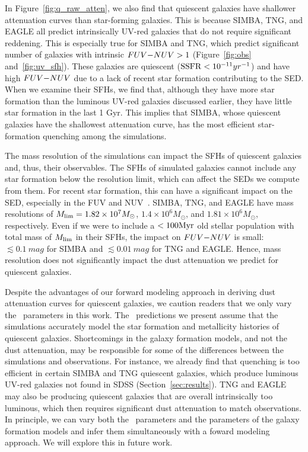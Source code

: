 In Figure~\ref{fig:q_raw_atten}, we also find that quiescent galaxies have
shallower attenuation curves than star-forming galaxies. 
This is because SIMBA, TNG, and EAGLE all predict intrinsically UV-red galaxies
that do not require significant reddening. 
This is especially true for SIMBA and TNG, which predict significant
number of galaxies with intrinsic $FUV{-}NUV > 1$ (Figure~\ref{fig:obs}
and~\ref{fig:uv_sfh}).
These galaxies are quiescent (${\rm SSFR} < 10^{-11}yr^{-1}$) and have high
$FUV{-}NUV$ due to a lack of recent star formation contributing to the
SED.
When we examine their SFHs, we find that, although they have more star
formation than the luminous UV-red galaxies discussed earlier, they have
little star formation in the last 1 Gyr. 
This implies that SIMBA, whose quiescent galaxies have the shallowest
attenuation curve, has the most efficient star-formation quenching among
the simulations. 

The mass resolution of the simulations can impact the SFHs of quiescent
galaxies and, thus, their observables.
The SFHs of simulated galaxies cannot include any star formation below the
resolution limit, which can affect the SEDs we compute from them. 
For recent star formation, this can have a significant impact on the SED,
especially in the FUV and NUV~\citep{leja2017}. 
SIMBA, TNG, and EAGLE have mass resolutions of $M_{\rm lim} = 1.82\times10^7M_\odot$, 
$1.4\times10^{6}M_\odot$, and $1.81\times10^6M_\odot$, respectively.
Even if we were to include a $< 100{\rm Myr}$ old stellar population
with total mass of $M_{\rm lim}$ in their SFHs, the impact on $FUV{-}NUV$ is small:
$\lesssim 0.1~mag$ for SIMBA and $\lesssim 0.01~mag$ for TNG and EAGLE.
Hence, mass resolution does not significantly impact the dust attenuation
we predict for quiescent galaxies.  

Despite the advantages of our forward modeling approach in deriving dust
attenuation curves for quiescent galaxies, we caution readers
that we only vary the \eda~parameters in this work.     
The \eda~predictions we present assume that the simulations accurately model
the star formation and metallicity histories of quiescent galaxies. 
Shortcomings in the galaxy formation models, and not the dust attenuation, may
be responsible for some of the differences between the simulations and
observations. 
For instance, we already find that quenching is too efficient in certain SIMBA
and TNG quiescent galaxies, which produce luminous UV-red galaxies not found in
SDSS (Section~\ref{sec:results}). 
TNG and EAGLE may also be producing quiescent galaxies that are
overall intrinsically too luminous, which then requires significant dust
attenuation to match observations.
In principle, we can vary both the \eda~parameters and the parameters
of the galaxy formation models and infer them simultaneously with a foward
modeling approach. 
We will explore this in future work. 
